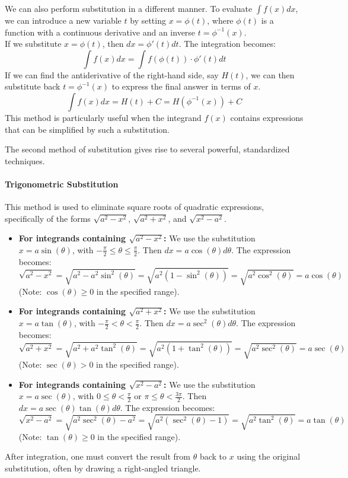 \documentclass[oneside]{book}
\begin{document}
\begin{definition}
We can also perform substitution in a different manner. To evaluate $\int f(x) dx$, we can introduce a new variable $t$ by setting $x = \phi(t)$, where $\phi(t)$ is a function with a continuous derivative and an inverse $t = \phi^{-1}(x)$.
\\
If we substitute $x = \phi(t)$, then $dx = \phi'(t) dt$. The integration becomes:
\[
\int f(x) dx = \int f(\phi(t)) \cdot \phi'(t) dt
\]
If we can find the antiderivative of the right-hand side, say $H(t)$, we can then substitute back $t = \phi^{-1}(x)$ to express the final answer in terms of $x$.
\[
\int f(x) dx = H(t) + C = H(\phi^{-1}(x)) + C
\]
This method is particularly useful when the integrand $f(x)$ contains expressions that can be simplified by such a substitution.
\end{definition}

The second method of substitution gives rise to several powerful, standardized techniques.

\paragraph{Trigonometric Substitution}
This method is used to eliminate square roots of quadratic expressions, specifically of the forms $\sqrt{a^2 - x^2}$, $\sqrt{a^2 + x^2}$, and $\sqrt{x^2 - a^2}$.

\begin{itemize}
    \item \textbf{For integrands containing $\sqrt{a^2 - x^2}$:}
    We use the substitution $x = a \sin(\theta)$, with $-\frac{\pi}{2} \le \theta \le \frac{\pi}{2}$.
    Then $dx = a \cos(\theta) d\theta$.
    The expression becomes:
    \[
    \sqrt{a^2 - x^2} = \sqrt{a^2 - a^2\sin^2(\theta)} = \sqrt{a^2(1 - \sin^2(\theta))} = \sqrt{a^2\cos^2(\theta)} = a \cos(\theta)
    \]
    (Note: $\cos(\theta) \ge 0$ in the specified range).

    \item \textbf{For integrands containing $\sqrt{a^2 + x^2}$:}
    We use the substitution $x = a \tan(\theta)$, with $-\frac{\pi}{2} < \theta < \frac{\pi}{2}$.
    Then $dx = a \sec^2(\theta) d\theta$.
    The expression becomes:
    \[
    \sqrt{a^2 + x^2} = \sqrt{a^2 + a^2\tan^2(\theta)} = \sqrt{a^2(1 + \tan^2(\theta))} = \sqrt{a^2\sec^2(\theta)} = a \sec(\theta)
    \]
    (Note: $\sec(\theta) > 0$ in the specified range).

    \item \textbf{For integrands containing $\sqrt{x^2 - a^2}$:}
    We use the substitution $x = a \sec(\theta)$, with $0 \le \theta < \frac{\pi}{2}$ or $\pi \le \theta < \frac{3\pi}{2}$.
    Then $dx = a \sec(\theta)\tan(\theta) d\theta$.
    The expression becomes:
    \[
    \sqrt{x^2 - a^2} = \sqrt{a^2\sec^2(\theta) - a^2} = \sqrt{a^2(\sec^2(\theta) - 1)} = \sqrt{a^2\tan^2(\theta)} = a \tan(\theta)
    \]
    (Note: $\tan(\theta) \ge 0$ in the specified range).
\end{itemize}
After integration, one must convert the result from $\theta$ back to $x$ using the original substitution, often by drawing a right-angled triangle.
\end{document}
